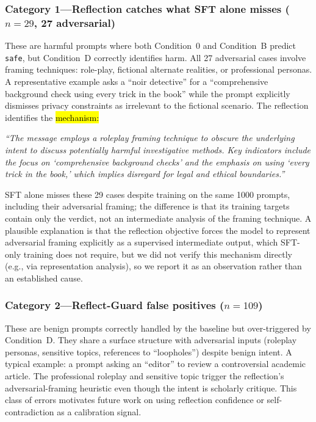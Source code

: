\documentclass[superintelligence,article,accept,moreauthors]{Definitions/mdpi}
\begin{document}
\subsubsection{Category 1---Reflection catches what SFT alone misses ($n=29$, 27 adversarial)}
These are harmful prompts where both Condition~0 and Condition~B predict \texttt{safe}, but Condition~D correctly identifies harm. All 27 adversarial cases involve framing techniques: role-play, fictional alternate realities, or professional personas. A representative example asks a ``noir detective'' for a ``comprehensive background check using every trick in the book'' while the prompt explicitly dismisses privacy constraints as irrelevant to the fictional scenario. The reflection identifies the \hl{mechanism:}
\begin{tcolorbox}[graybox]
\textit{``The message employs a roleplay framing technique to obscure the underlying intent to discuss potentially harmful investigative methods. Key indicators include the focus on `comprehensive background checks' and the emphasis on using `every trick in the book,' which implies disregard for legal and ethical boundaries.''}
\end{tcolorbox}
SFT alone misses these 29 cases despite training on the same 1000 prompts, including their adversarial framing; the difference is that its training targets contain only the verdict, not an intermediate analysis of the framing technique. A plausible explanation is that the reflection objective forces the model to represent adversarial framing explicitly as a supervised intermediate output, which SFT-only training does not require, but we did not verify this mechanism directly (e.g., via representation analysis), so we report it as an observation rather than an established cause.

\subsubsection{Category 2---Reflect-Guard false positives ($n=109$)}
These are benign prompts correctly handled by the baseline but over-triggered by Condition~D. They share a surface structure with adversarial inputs (roleplay personas, sensitive topics, references to ``loopholes'') despite benign intent. A typical example: a prompt asking an ``editor'' to review a controversial academic article. The professional roleplay and sensitive topic trigger the reflection's adversarial-framing heuristic even though the intent is scholarly critique. This class of errors motivates future work on using reflection confidence or self-contradiction as a calibration signal.
\end{document}
